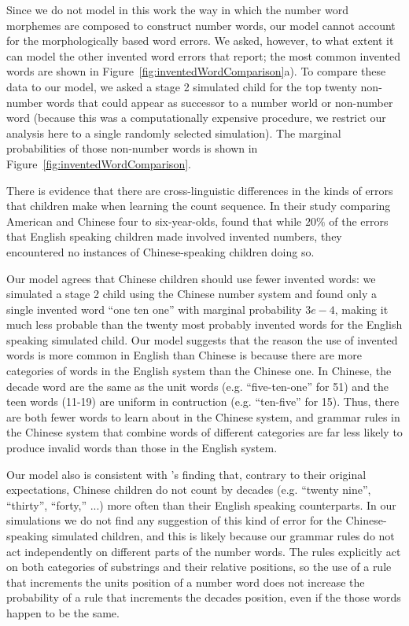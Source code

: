 \documentclass[10pt,letterpaper]{article}
\begin{document}
Since we do not model in this work the way in which the number word
morphemes are composed to construct number words, our model cannot
account for the morphologically based word errors. We asked, however,
to what extent it can model the other invented word errors that
\citeauthor{FusRicBriar1982} report; the most common invented words
are shown in Figure~\ref{fig:inventedWordComparison}a). To compare
these data to our model, we asked a stage 2 simulated child for the
top twenty non-number words that could appear as successor to a number
world or non-number word (because this was a computationally expensive
procedure, we restrict our analysis here to a single randomly selected
simulation). The marginal probabilities of those non-number words is
shown in Figure~\ref{fig:inventedWordComparison}.

There is evidence that there are cross-linguistic differences in the
kinds of errors that children make when learning the count sequence.
In their study comparing American and Chinese four to six-year-olds,
\citeauthor{miller1987counting} found that while $20\%$ of the errors
that English speaking children made involved invented numbers, they
encountered no instances of Chinese-speaking children doing so.


Our model agrees that Chinese children should use fewer invented
words: we simulated a stage 2 child using the Chinese number system
and found only a single invented word ``one ten one'' with marginal
probability $3e-4$, making it much less probable than the twenty most
probably invented words for the English speaking simulated child.  Our
model suggests that the reason the use of invented words is more
common in English than Chinese is because there are more categories of
words in the English system than the Chinese one. In Chinese, the
decade word are the same as the unit words (e.g. ``five-ten-one'' for
51) and the teen words (11-19) are uniform in contruction
(e.g. ``ten-five'' for 15). Thus, there are both fewer words to learn
about in the Chinese system, and grammar rules in the Chinese system
that combine words of different categories are far less likely to
produce invalid words than those in the English system.

Our model also is consistent with \citeauthor{miller1987counting}'s finding
that, contrary to their original expectations, Chinese children do not
count by decades (e.g. ``twenty nine'', ``thirty'', ``forty,'' ...)
more often than their English speaking counterparts. In our
simulations we do not find any suggestion of this kind of error for
the Chinese-speaking simulated children, and this is likely because
our grammar rules do not act independently on different parts of the
number words. The rules explicitly act on both categories of
substrings and their relative positions, so the use of a rule that
increments the units position of a number word does not increase the
probability of a rule that increments the decades position, even if
the those words happen to be the same.
\end{document}
